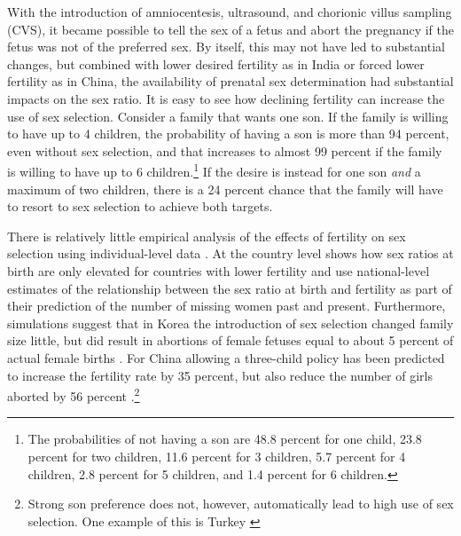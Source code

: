 With the introduction of amniocentesis, ultrasound, and chorionic villus sampling (CVS), it became possible to tell the sex of a fetus and abort the pregnancy if the fetus was not of the preferred sex. By itself, this may not have led to substantial changes, but combined with lower desired fertility as in India or forced lower fertility as in China, the availability of prenatal sex determination had substantial impacts on the sex ratio. It is easy to see how declining fertility can increase the use of sex selection. Consider a family that wants one son. If the family is willing to have up to 4 children, the probability of having a son is more than 94 percent, even without sex selection, and that increases to almost 99 percent if the family is willing to have up to 6 children.\footnote{The probabilities of not having a son are 48.8 percent for one child, 23.8 percent for two children, 11.6 percent for 3 children, 5.7 percent for 4 children, 2.8 percent for 5 children, and 1.4 percent for 6 children.} If the desire is instead for one son \emph{and} a maximum of two children, there is a 24 percent chance that the family will have to resort to sex selection to achieve both targets.

There is relatively little empirical analysis of the effects of fertility on sex selection using individual-level data \citep{park95,Ebenstein2011}. At the country level \citet{Bongaarts2013} shows how sex ratios at birth are only elevated for countries with lower fertility and \citet{Bongaarts2015} use national-level estimates of the relationship between the sex ratio at birth and fertility as part of their prediction of the number of missing women past and present. Furthermore, simulations suggest that in Korea the introduction of sex selection changed family size little, but did result in abortions of female fetuses equal to about 5 percent of actual female births \citep{park95}. For China allowing a three-child policy has been predicted to increase the fertility rate by 35 percent, but also reduce the number of girls aborted by 56 percent \citep{Ebenstein2011}.\footnote{Strong son preference does not, however, automatically lead to high use of sex selection. One example of this is Turkey \citep{Altindag2016}}

